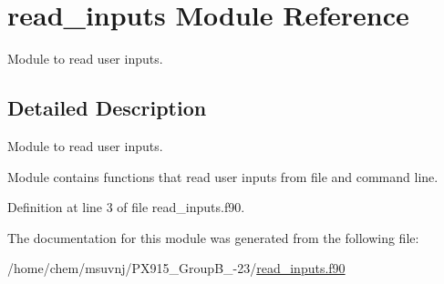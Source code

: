 \hypertarget{classread__inputs}{\section{read\-\_\-inputs Module Reference}
\label{classread__inputs}
}


Module to read user inputs.  




\subsection{Detailed Description}
Module to read user inputs. 

Module contains functions that read user inputs from file and command line. 

Definition at line 3 of file read\-\_\-inputs.\-f90.



The documentation for this module was generated from the following file\-:\begin{DoxyCompactItemize}
\item 
/home/chem/msuvnj/\-P\-X915\-\_\-\-Group\-B\-\_-\/23/\hyperlink{read__inputs_8f90}{read\-\_\-inputs.\-f90}\end{DoxyCompactItemize}
